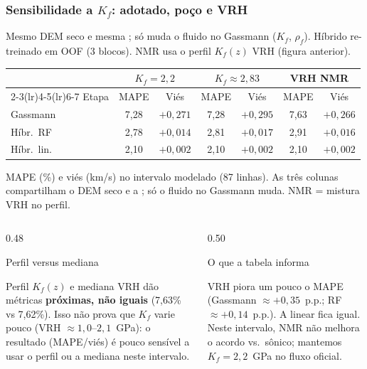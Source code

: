 \documentclass[aspectratio=169,10pt]{beamer}
\begin{document}
\begin{frame}[t]
  \frametitle{Sensibilidade a $K_f$: adotado, poço e VRH}
  \scriptsize
  Mesmo DEM seco e mesma \phiND{}; só muda o fluido no Gassmann
  ($K_f$, $\rho_f$). Híbrido re-treinado em OOF (3 blocos).
  NMR usa o perfil $K_f(z)$ VRH (figura anterior).
  \par
  \vspace{0.08cm}
  \centering
  \setlength{\tabcolsep}{4pt}
  \begin{tabular}{lcccccc}
    \toprule
    & \multicolumn{2}{c}{$K_f=2{,}2$} &
      \multicolumn{2}{c}{$K_f\approx 2{,}83$} &
      \multicolumn{2}{c}{VRH NMR} \\
    \cmidrule(lr){2-3}\cmidrule(lr){4-5}\cmidrule(lr){6-7}
    Etapa & MAPE & Viés & MAPE & Viés & MAPE & Viés \\
    \midrule
    Gassmann & 7,28 & $+0{,}271$ & 7,28 & $+0{,}295$ &
      7,63 & $+0{,}266$ \\
    Híbr.\ RF & 2,78 & $+0{,}014$ & 2,81 & $+0{,}017$ &
      2,91 & $+0{,}016$ \\
    Híbr.\ lin. & 2,10 & $+0{,}002$ & 2,10 & $+0{,}002$ &
      2,10 & $+0{,}002$ \\
    \bottomrule
  \end{tabular}
  \par
  {\tiny MAPE (\%) e viés (km/s) no intervalo modelado (87 linhas).
   As três colunas compartilham o DEM seco e a \phiND{};
   só o fluido no Gassmann muda. NMR = mistura VRH no perfil.}
  \vspace{0.10cm}
  \begin{columns}[T,onlytextwidth]
    \begin{column}{0.48\textwidth}
      \begin{block}{Perfil versus mediana}
        {\fontsize{6.5}{7.6}\selectfont
        Perfil $K_f(z)$ e mediana VRH dão métricas
        \textbf{próximas, não iguais}
        (7,63\% vs 7,62\%).
        Isso não prova que $K_f$ varie pouco
        (VRH $\approx 1{,}0$--$2{,}1$~GPa):
        o resultado (MAPE/viés) é pouco sensível
        a usar o perfil ou a mediana neste intervalo.\par}
      \end{block}
    \end{column}
    \begin{column}{0.50\textwidth}
      \begin{exampleblock}{O que a tabela informa}
        {\fontsize{6.5}{7.6}\selectfont
        VRH piora um pouco o MAPE
        (Gassmann $\approx +0{,}35$~p.p.;
        RF $\approx +0{,}14$~p.p.).
        A linear fica igual.
        Neste intervalo, NMR não melhora o acordo
        vs.\ sônico; mantemos $K_f=2{,}2$~GPa no
        fluxo oficial.\par}
      \end{exampleblock}
    \end{column}
  \end{columns}
\end{frame}
\end{document}
